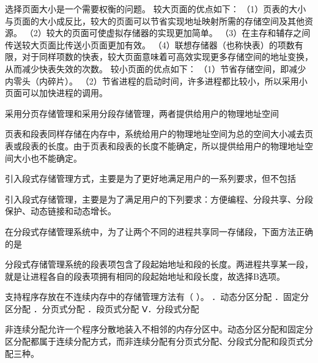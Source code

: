 \begin{solution}选择页面大小是一个需要权衡的问题。 较大页面的优点如下：
（1）页表的大小与页面的大小成反比，较大的页面可以节省实现地址映射所需的存储空间及其他资源。
（2）较大的页面可使虚拟存储器的实现更加简单。
（3）在主存和辅存之间传送较大页面比传送小页面更加有效。
（4）联想存储器（也称快表）的项数有限，对于同样项数的快表，较大页面意味着可高效实现更多存储空间的地址变换，从而减少快表失效的次数。
较小页面的优点如下： （1）节省存储空间，即减少内零头（内碎片）。
（2）节省进程的启动时间，许多进程都比较小，所以采用小页面可以加快进程的调用。
\end{solution}
\question 采用分页存储管理和采用分段存储管理，两者提供给用户的物理地址空间
\par{}
\begin{solution}页表和段表同样存储在内存中，系统给用户的物理地址空间为总的空间大小减去页表或段表的长度。由于页表和段表的长度不能确定，所以提供给用户的物理地址空间大小也不能确定。
\end{solution}
\question 引入段式存储管理方式，主要是为了更好地满足用户的一系列要求，但不包括
\par{}
\begin{solution}引入段式存储管理，主要是为了满足用户的下列要求：方便编程、分段共享、分段保护、动态链接和动态增长。
\end{solution}
\question 在分段式存储管理系统中，为了让两个不同的进程共享同一存储段，下面方法正确的是
\par{}
\begin{solution}分段式存储管理系统的段表项包含了段起始地址和段的长度。两进程共享某一段，就是让进程各自的段表项拥有相同的段起始地址和段长度，故选择B选项。
\end{solution}
\question 支持程序存放在不连续内存中的存储管理方法有（ ）。 ．动态分区分配
．固定分区分配 ．分页式分配 ．段页式分配 Ⅴ．分段式分配
\par{}
\begin{solution}非连续分配允许一个程序分散地装入不相邻的内存分区中。动态分区分配和固定分区分配都属于连续分配方式，而非连续分配有分页式分配、分段式分配和段页式分配三种。
\end{solution}
